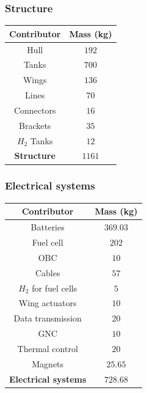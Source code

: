 \subsubsection{Structure}
\begin{center}
	\begin{tabular}[H]{|c|c|}
		\hline
		\cellcolor{gray!50}Contributor & \cellcolor{gray!50}Mass (kg)\\
		\hline
		Hull & $192$\\
		\hline
		Tanks & $700$\\
		\hline
		Wings & $136$\\
		\hline
		Lines & $70$\\
		\hline
		Connectors & $16$\\
		\hline
		Brackets & $35$\\
		\hline
		$H_2$ Tanks & $12$\\
		\hline
		\cellcolor{green!30}\textbf{Structure} & \textbf{$1161$}\\
		\hline
	\end{tabular}
\end{center}
\subsubsection{Electrical systems}
\begin{center}
	\begin{tabular}[H]{|c|c|}
		\hline
		\cellcolor{gray!50}Contributor & \cellcolor{gray!50}Mass (kg)\\
		\hline
		Batteries & $369.03$\\
		\hline
		Fuel cell & $202$\\
		\hline
		OBC & $10$\\
		\hline
		Cables & $57$\\
		\hline
		$H_2$ for fuel cells & $5$\\
		\hline
		Wing actuators & $10$\\
		\hline
		Data transmission & $20$\\
		\hline
		GNC & $10$\\
		\hline
		Thermal control & $20$\\
		\hline
		Magnets & $25.65$\\
		\hline
		\cellcolor{green!30}\textbf{Electrical systems} & \textbf{$728.68$}\\
		\hline
	\end{tabular}
\end{center}
